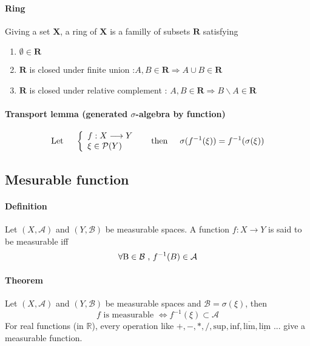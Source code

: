 \documentclass[a4paper,10pt]{article}
\begin{document}
\paragraph{Ring} Giving a set $\textbf{X}$, a ring of $\textbf{X}$ is a familly of subsets $\textbf{R}$ satisfying 
\begin{enumerate}
 \item $\emptyset \in \textbf{R}$
 \item $\textbf{R}$ is closed under finite union :$ A,B \in \textbf{R} \Longrightarrow A \cup B \in \textbf{R} $
 \item $\textbf{R}$ is closed under relative complement : $ A,B \in \textbf{R} \Longrightarrow B \backslash A \in \textbf{R}$
\end{enumerate}

\paragraph{Transport lemma (generated $\sigma$-algebra by function)} 
\[
\text{Let} \hspace{5mm} 
\left\{ 
\begin{array}{l}
 f : X \longrightarrow Y \\
 \xi \in \mathcal{P}(Y)
\end{array}\right.
\hspace{5mm} \text{then} \hspace{5mm}
\sigma(f^{-1}(\xi)) = f^{-1}(\sigma(\xi))
\]

\subsection{Mesurable function}

\paragraph{Definition}
Let $(X,\mathcal{A})$ and $(Y,\mathcal{B})$ be measurable spaces. A function $f:X \longrightarrow Y$ is said to be measurable iff 
\[
\forall \text{B} \in \mathcal{B} \hbox{ , } f^{-1}(B) \in \mathcal{A} 
\]

\paragraph{Theorem} Let $(X,\mathcal{A})$ and $(Y,\mathcal{B})$ be measurable spaces and $\mathcal{B} = \sigma(\xi)$, then 
\[
f \text{ is measurable } \Longleftrightarrow f^{-1}(\xi) \subset \mathcal{A}
\]
For real functions (in $\mathbb{R}$), every operation like $+,-,*,/,\text{sup},\text{inf},\overline{\text{lim}}, \underline{\text{lim}}$ ... give a measurable function.
\end{document}
